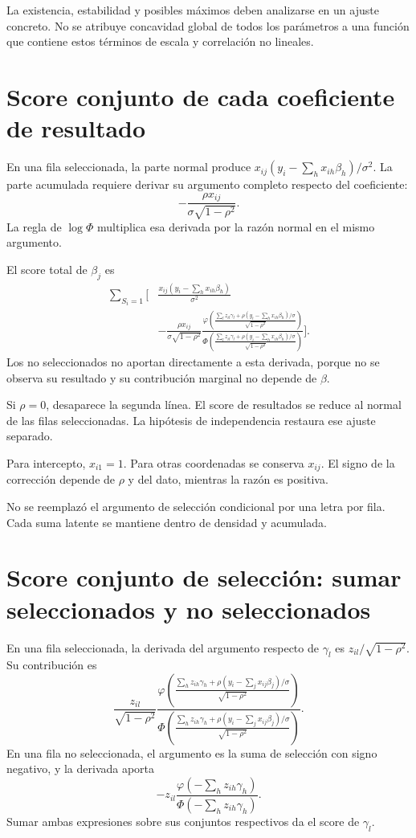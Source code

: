 \documentclass[11pt,a4paper]{article}
\begin{document}
La existencia, estabilidad y
posibles máximos deben
analizarse en un ajuste concreto.
No se atribuye concavidad
global de todos los parámetros
a una función que contiene
estos términos de escala
y correlación no lineales.

\clearpage
\section{Score conjunto de cada coeficiente de resultado}\label{unidad143}
En una fila seleccionada,
la parte normal produce
\(x_{ij}(y_i-\sum_hx_{ih}\beta_h)/\sigma^2\).
La parte acumulada requiere
derivar su argumento completo
respecto del coeficiente:
\[
-\frac{\rho x_{ij}}{\sigma\sqrt{1-\rho^2}}.
\]
La regla de \(\log\Phi\)
multiplica esa derivada
por la razón normal
en el mismo argumento.

El score total de \(\beta_j\) es
\[
\begin{aligned}
\sum_{S_i=1}\Bigg[
&\frac{x_{ij}(y_i-\sum_hx_{ih}\beta_h)}{\sigma^2}\\
&-\frac{\rho x_{ij}}{\sigma\sqrt{1-\rho^2}}
\frac{
\varphi\left(\frac{\sum_lz_{il}\gamma_l+
\rho(y_i-\sum_hx_{ih}\beta_h)/\sigma}{\sqrt{1-\rho^2}}\right)}
{\Phi\left(\frac{\sum_lz_{il}\gamma_l+
\rho(y_i-\sum_hx_{ih}\beta_h)/\sigma}{\sqrt{1-\rho^2}}\right)}
\Bigg].
\end{aligned}
\]
Los no seleccionados no
aportan directamente a esta
derivada, porque no se
observa su resultado y
su contribución marginal
no depende de \(\beta\).

\begin{ejemplo}
Si \(\rho=0\), desaparece
la segunda línea.
El score de resultados
se reduce al normal
de las filas seleccionadas.
La hipótesis de independencia
restaura ese ajuste separado.
\end{ejemplo}
Para intercepto, \(x_{i1}=1\).
Para otras coordenadas
se conserva \(x_{ij}\).
El signo de la
corrección depende de \(\rho\)
y del dato,
mientras la razón
es positiva.

No se reemplazó el argumento
de selección condicional
por una letra por fila.
Cada suma latente se
mantiene dentro de
densidad y acumulada.

\clearpage
\section{Score conjunto de selección: sumar seleccionados y no seleccionados}\label{unidad144}
En una fila seleccionada,
la derivada del argumento
respecto de \(\gamma_l\) es
\(z_{il}/\sqrt{1-\rho^2}\).
Su contribución es
\[
\frac{z_{il}}{\sqrt{1-\rho^2}}
\frac{
\varphi\left(\frac{\sum_hz_{ih}\gamma_h+
\rho(y_i-\sum_jx_{ij}\beta_j)/\sigma}{\sqrt{1-\rho^2}}\right)}
{\Phi\left(\frac{\sum_hz_{ih}\gamma_h+
\rho(y_i-\sum_jx_{ij}\beta_j)/\sigma}{\sqrt{1-\rho^2}}\right)}.
\]
En una fila no seleccionada,
el argumento es la suma
de selección con signo negativo,
y la derivada aporta
\[
-z_{il}
\frac{\varphi(-\sum_hz_{ih}\gamma_h)}
{\Phi(-\sum_hz_{ih}\gamma_h)}.
\]
Sumar ambas expresiones sobre
sus conjuntos respectivos
da el score de \(\gamma_l\).
\end{document}
